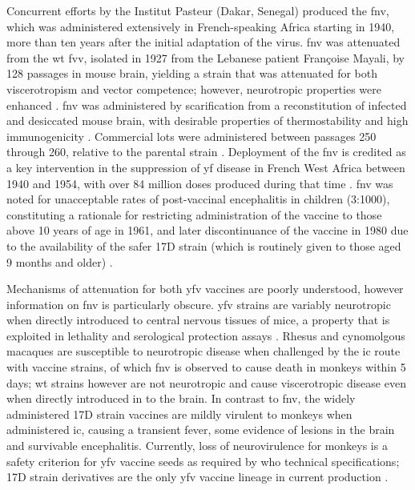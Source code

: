 Concurrent efforts by the Institut Pasteur (Dakar, Senegal) produced the \gls{fnv}, which was administered extensively in French-speaking Africa starting in 1940, more than ten years after the initial adaptation of the virus. \Gls{fnv} was attenuated from the \gls{wt} \gls{fvv}, isolated in 1927 from the Lebanese patient Françoise Mayali, by 128 passages in mouse brain, yielding a strain that was attenuated for both viscerotropism and vector competence; however, neurotropic properties were enhanced \parencite{Lloyd:1933wv,Davis:1932vb, Durieux:1956wx}. \Gls{fnv} was administered by scarification from a reconstitution of infected and desiccated mouse brain, with desirable properties of thermostability and high immunogenicity \parencite{Stuart:1953uaa,Durieux:1956wx}. Commercial lots were administered between passages 250 through 260, relative to the parental strain \parencite{Durieux:1956wx}. Deployment of the \gls{fnv} is credited as a key intervention in the suppression of \gls{yf} disease in French West Africa between 1940 and 1954, with over 84 million doses produced during that time \parencite{Durieux:1956tq,Durieux:1956wx}. \Gls{fnv} was noted for unacceptable rates of post-vaccinal encephalitis in children (3:1000), constituting a rationale for restricting administration of the vaccine to those above 10 years of age in 1961, and later discontinuance of the vaccine in 1980 due to the availability of the safer 17D strain (which is routinely given to those aged 9 months and older) \parencite{Vainio:1998wy}.

Mechanisms of attenuation for both \gls{yfv} vaccines are poorly understood, however information on \gls{fnv} is particularly obscure. \Gls{yfv} strains are variably neurotropic when directly introduced to central nervous tissues of mice, a property that is exploited in lethality and serological protection assays \parencite{Theiler:1930gy,Sawyer:1931wu,Fitzgeorge:1980vl,Barrett:1986iw}. Rhesus and cynomolgous macaques are susceptible to neurotropic disease when challenged by the \gls{ic} route with vaccine strains, of which \gls{fnv} is observed to cause death in monkeys within 5 days; \gls{wt} strains however are not neurotropic and cause viscerotropic disease even when directly introduced in to the brain. In contrast to \gls{fnv}, the widely administered 17D strain vaccines are mildly virulent to monkeys when administered \gls{ic}, causing a transient fever, some evidence of lesions in the brain and survivable encephalitis. Currently, loss of neurovirulence for monkeys is a safety criterion for \gls{yfv} vaccine seeds as required by \gls{who} technical specifications; 17D strain derivatives are the only \gls{yfv} vaccine lineage in current production \parencite{WorldHealthOrganization:2010wo}. 

